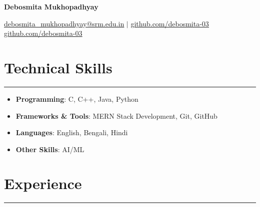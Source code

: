 \documentclass[letterpaper, 10pt]{article}
\begin{document}
\begin{center}

\textbf{\LARGE Debosmita Mukhopadhyay} \\ \vspace{2pt}

\href{mailto:debosmita_mukhopadhyay@srm.edu.in}{\underline{debosmita_mukhopadhyay@srm.edu.in}} $|$
\href{https://github.com/debosmita-03}{\underline{github.com/debosmita-03}}
\href{https://github.com/debosmita-03}{\underline{github.com/debosmita-03}}

\end{center}

\section*{Technical Skills}
\hrule
\vspace{4pt}

\begin{itemize}

\item[] \textbf{Programming}: C, C++, Java, Python

\item[] \textbf{Frameworks \& Tools}: MERN Stack Development, Git, GitHub

\item[] \textbf{Languages}: English, Bengali, Hindi

\item[] \textbf{Other Skills}: AI/ML

\end{itemize}

\section*{Experience}
\hrule
\vspace{4pt}
\end{document}
